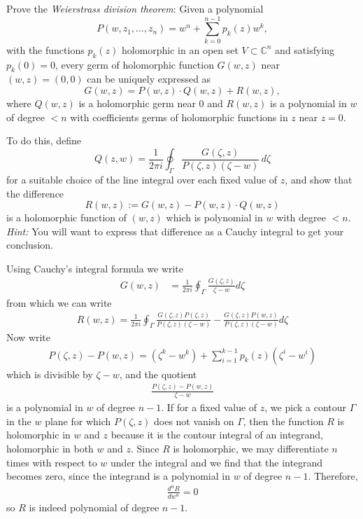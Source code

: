 \documentclass[12pt]{article}  %
\begin{document}
\begin{problem}{4}
Prove the \emph{Weierstrass division theorem}:
Given a polynomial
\[
    P(w,z_1,\dots,z_n) = w^n + \sum_{k=0}^{n-1} p_k(z) w^k,
\]
with the functions $p_k(z)$ holomorphic in an open set $V \subset \mathbb{C}^n$ and satisfying $p_k(0)=0$, every germ of holomorphic function $G(w,z)$ near $(w,z)=(0,0)$ can be uniquely expressed as
\[
    G(w,z) = P(w,z)\cdot Q(w,z) + R(w,z),
\]
where $Q(w,z)$ is a holomorphic germ near $0$ and $R(w,z)$ is a polynomial in $w$ of degree $< n$ with coefficients germs of holomorphic functions in $z$ near $z=0$.

To do this, define
\[
    Q(z,w) = \frac{1}{2\pi i} \oint_\Gamma \frac{G(\zeta, z)}{P(\zeta, z)(\zeta - w)} \, d\zeta
\]
for a suitable choice of the line integral over each fixed value of $z$, and show that the difference
\[
    R(w,z) := G(w,z) - P(w,z)\cdot Q(w,z)
\]
is a holomorphic function of $(w,z)$ which is polynomial in $w$ with degree $< n$.
\emph{Hint:} You will want to express that difference as a Cauchy integral to get your conclusion.
\end{problem}

\begin{solution}
    Using Cauchy's integral formula we write \begin{align*}
        G(w,z) & = \frac{1}{2\pi i}\oint_{\Gamma} \frac{G(\zeta, z)}{\zeta - w} d\zeta
    \end{align*}
    from which we can write \begin{align*}
        R(w,z) = \frac{1}{2\pi i}\oint_{\Gamma}  \frac{G(\zeta, z)P(\zeta,z)}{P(\zeta,z)(\zeta - w)} - \frac{G(\zeta,z)P(w,z)}{P(\zeta,z)(\zeta - w)} d\zeta
    \end{align*}
    Now write \begin{align*}
        P(\zeta,z) - P(w,z) = (\zeta^k - w^k) + \sum_{i=1}^{k-1} p_k(z)(\zeta^i - w^i)
    \end{align*} which is divisible by $\zeta - w$, and the quotient \begin{align*}
        \frac{P(\zeta,z) - P(w,z)}{\zeta - w}
    \end{align*} is a polynomial in $w$ of degree $n-1$. If for a fixed value of $z$, we pick a contour $\Gamma$ in the $w$ plane for which $P(\zeta,z)$ does not vanish on $\Gamma$, then the function $R$ is holomorphic in $w$ and $z$ because it is the contour integral of an integrand, holomorphic in both $w$ and $z$. Since $R$ is holomorphic, we may differentiate $n$ times with respect to $w$ under the integral and we find that the integrand becomes zero, since the integrand is a polynomial in $w$ of degree $n-1$. Therefore, \begin{align*}
        \frac{d^nR}{dw^n} = 0
    \end{align*} so $R$ is indeed polynomial of degree $n-1$.
\end{solution}
\end{document}
